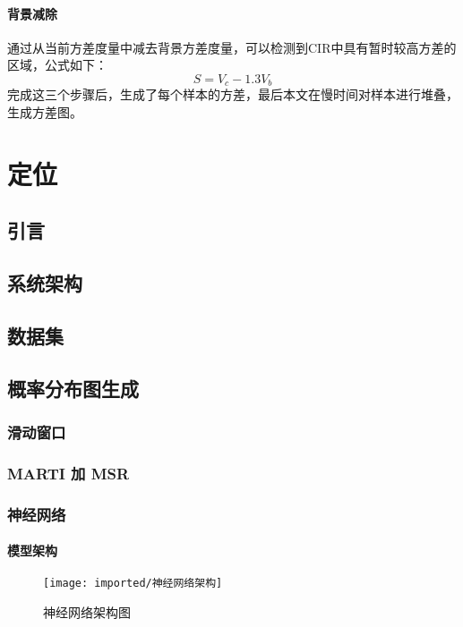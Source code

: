 \subsubsection{背景减除}
通过从当前方差度量中减去背景方差度量，可以检测到CIR中具有暂时较高方差的区域，公式如下：
\begin{equation}
    S = V_c - 1.3V_b
\end{equation}
完成这三个步骤后，生成了每个样本的方差，最后本文在慢时间对样本进行堆叠，生成方差图。


\chapter{定位}
\section{引言}

\section{系统架构}

\section{数据集}

\section{概率分布图生成}

\subsection{滑动窗口}

\subsection{MARTI 加 MSR}

\subsection{神经网络}
\subsubsection{模型架构}
\begin{figure}[htbp]
    \centering
    \texttt{[image: imported/神经网络架构]}
    \caption{\label{fig:神经网络架构图}神经网络架构图}
\end{figure}
